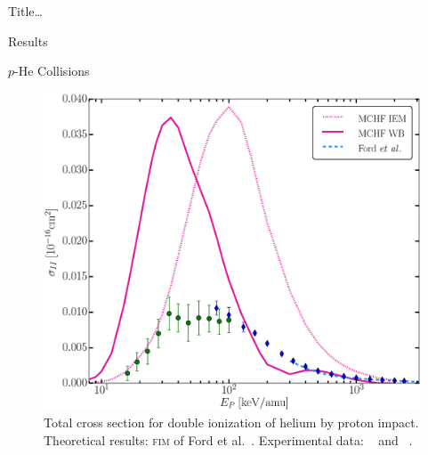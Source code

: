 \documentclass[letterpaper, 10 pt]{report}
\begin{document}
\begin{chapter}{ Title\dots \label{chap:p-he2p-he}}
\begin{section}{Results \label{sec:phe2p-res}}
\begin{subsection}{\texorpdfstring{$p$}{p}-He Collisions \label{sec:phe-res}}
\begin{figure}[ht]
\begin{minipage}{.49\linewidth}
               \centering
               \includegraphics[width = \linewidth]{./images/phe/phe-II.eps}
               \caption[Total cross section for double ionization of helium by proton impact.]
                       {Total cross section for double ionization of helium by proton impact.
                        Theoretical results: \textsc{fim} of Ford et al.~\cite{FR-94}.
                        Experimental data: {\color{OliveGreen}{$\bullet$}}~\cite{SG89} and
                        {\color{blue}{$\blacklozenge$}}~\cite{SG85}. \label{fig:phe-ii}}

            \end{minipage} \hspace{0.04\linewidth} %
            \begin{minipage}{.49\linewidth}


\end{minipage}
\end{figure}
\end{subsection}
\end{section}
\end{chapter}
\end{document}
